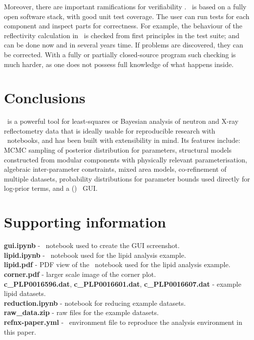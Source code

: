 \documentclass[pdf,preprint]{iucr}
\begin{document}
Moreover, there are important ramifications for verifiability \cite{Chirigati2013}. \ is based on a fully open software stack, with good unit test coverage. The user can run tests for each component and inspect parts for correctness. For example, the behaviour of the reflectivity calculation in \ is checked from first principles in the test suite; and can be done now and in several years time. If problems are discovered, they can be corrected. With a fully or partially closed-source program such checking is much harder, as one does not possess full knowledge of what happens inside.

\section{Conclusions}\label{conclusions}

\ is a powerful tool for least-squares or Bayesian analysis of neutron and X-ray reflectometry data that is ideally usable for reproducible research with \Jupyter\ notebooks, and has been built with extensibility in mind. Its features include: MCMC sampling of posterior distribution for parameters, structural models constructed from modular components with physically relevant parameterisation, algebraic inter-parameter constraints, mixed area models, co-refinement of multiple datasets, probability distributions for parameter bounds used directly for log-prior terms, and a (\Jupyter) \ipywidgets\ GUI.


\section{Supporting information}

\noindent
\textbf{gui.ipynb} - \Jupyter\ notebook used to create the GUI screenshot.\\
\textbf{lipid.ipynb} - \Jupyter\ notebook used for the lipid analysis example.\\
\textbf{lipid.pdf} - PDF view of the \Jupyter\ notebook used for the lipid analysis example.\\
\textbf{corner.pdf} - larger scale image of the corner plot.\\
\textbf{c\_PLP0016596.dat}, \textbf{c\_PLP0016601.dat}, \textbf{c\_PLP0016607.dat} - example lipid datasets.\\
\textbf{reduction.ipynb} - notebook for reducing example datasets.\\
\textbf{raw\_data.zip} - raw files for the example datasets.\\
\textbf{refnx-paper.yml} - \conda\ environment file to reproduce the analysis environment in this paper.



\end{document}
